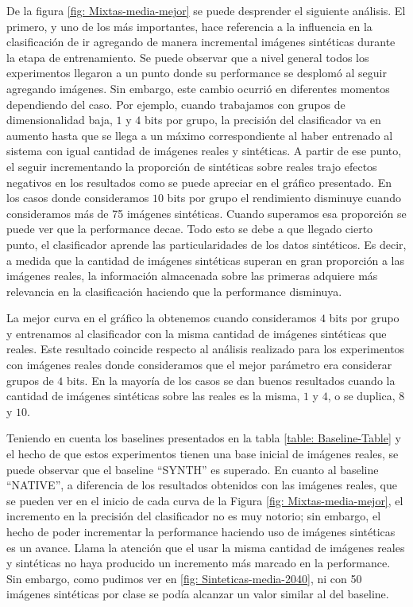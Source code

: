 	De la figura \ref{fig: Mixtas-media-mejor} se puede desprender el siguiente análisis. El primero, y uno de los más importantes, hace referencia a la influencia en la clasificación de ir agregando de manera incremental imágenes sintéticas durante la etapa de entrenamiento. Se puede observar que a nivel general todos los experimentos llegaron a un punto donde su performance se desplomó al seguir agregando imágenes. Sin embargo, este cambio ocurrió en diferentes momentos dependiendo del caso. Por ejemplo, cuando trabajamos con grupos de dimensionalidad baja, $1$ y $4$ bits por grupo, la precisión del clasificador va en aumento hasta que se llega a un máximo correspondiente al haber entrenado al sistema con igual cantidad de imágenes reales y sintéticas. A partir de ese punto, el seguir incrementando la proporción de sintéticas sobre reales trajo efectos negativos en los resultados como se puede apreciar en el gráfico presentado. En los casos donde consideramos $10$ bits por grupo el rendimiento disminuye cuando consideramos más de 75 imágenes sintéticas. Cuando superamos esa proporción se puede ver que la performance decae. Todo esto se debe a que llegado cierto punto, el clasificador aprende las particularidades de los datos sintéticos. Es decir, a medida que la cantidad de imágenes sintéticas superan en gran proporción a las imágenes reales, la información almacenada sobre las primeras adquiere más relevancia en la clasificación haciendo que la performance disminuya.

	 La mejor curva en el gráfico la obtenemos cuando consideramos $4$ bits por grupo y entrenamos al clasificador con la misma cantidad de imágenes sintéticas que reales. Este resultado coincide respecto al análisis realizado para los experimentos con imágenes reales donde consideramos que el mejor parámetro era considerar grupos de $4$ bits. En la mayoría de los casos se dan buenos resultados cuando la cantidad de imágenes sintéticas sobre las reales es la misma, $1$ y $4$, o se duplica, $8$ y $10$.

	 Teniendo en cuenta los baselines presentados en la tabla \ref{table: Baseline-Table} y el hecho de que estos experimentos tienen una base inicial de imágenes reales, se puede observar que el baseline ``SYNTH'' es superado. En cuanto al baseline ``NATIVE'', a diferencia de los resultados obtenidos con las imágenes reales, que se pueden ver en el inicio de cada curva de la Figura \ref{fig: Mixtas-media-mejor}, el incremento en la precisión del clasificador no es muy notorio; sin embargo, el hecho de poder incrementar la performance haciendo uso de imágenes sintéticas es un avance. Llama la atención que el usar la misma cantidad de imágenes reales y sintéticas no haya producido un incremento más marcado en la performance. Sin embargo, como pudimos ver en \ref{fig: Sinteticas-media-2040}, ni con 50 imágenes sintéticas por clase se podía alcanzar un valor similar al del baseline.

